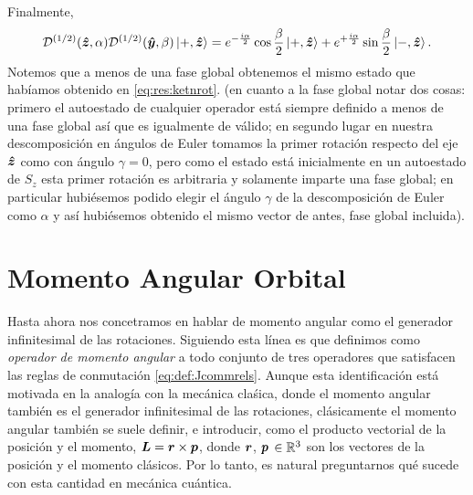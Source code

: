 \documentclass[10pt, a4paper]{article}
\numberwithin{equation}{subsection}
\begin{document}
Finalmente,
\begin{equation}
  \RotationOp[1/2](\vers{z},\alpha)
    \RotationOp[1/2](\vers{y},\beta)\ket{+,\vers{z}} =
    e^{-\frac{i \alpha}{2}} \cos\frac{\beta}{2}\ket{+,\vers{z}} +
    e^{+\frac{i \alpha}{2}} \sin\frac{\beta}{2}\ket{-,\vers{z}}.
\end{equation}
Notemos que a menos de una fase global obtenemos el mismo estado que habíamos
obtenido en \eqref{eq:res:ketnrot}. (en cuanto a la fase global notar dos
cosas: primero el autoestado de cualquier operador está siempre definido a
menos de una fase global así que es igualmente de válido; en segundo lugar en
nuestra descomposición en ángulos de Euler tomamos la primer rotación respecto
del eje $\vu*{z}$ como con ángulo $\gamma = 0$, pero como el estado está
inicialmente en un autoestado de $S_z$ esta primer rotación es arbitraria y
solamente imparte una fase global; en particular hubiésemos podido elegir el
ángulo $\gamma$ de la descomposición de Euler como $\alpha$ y así hubiésemos
obtenido el mismo vector de antes, fase global incluida).

\section{Momento Angular Orbital}

Hasta ahora nos concetramos en hablar de momento angular como el generador
infinitesimal de las rotaciones. Siguiendo esta línea es que definimos como
\emph{operador de momento angular} a todo conjunto de tres operadores que
satisfacen las reglas de conmutación \eqref{eq:def:Jcommrels}. Aunque esta
identificación está motivada en la analogía con la mecánica claśica, donde el
momento angular también es el generador infinitesimal de las rotaciones,
clásicamente el momento angular también se suele definir, e introducir, como el
producto vectorial de la posición y el momento, $\vb*{L} =
\vb*{r}\times\vb*{p}$, donde $\vb*{r}$, $\vb*{p}$ $\in \mathbb{R}^3$ son los
vectores de la posición y el momento clásicos. Por lo tanto, es natural
preguntarnos qué sucede con esta cantidad en mecánica cuántica.
\end{document}
